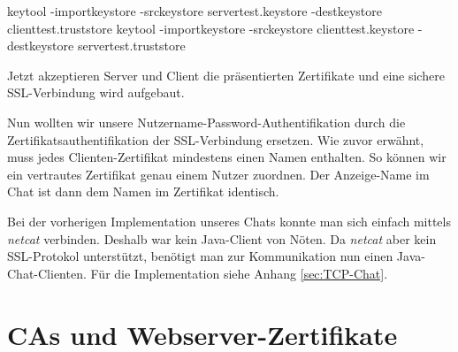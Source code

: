 \documentclass[a4paper,12bpt]{scrartcl}
\begin{document}
\begin{usercommands}
keytool -importkeystore -srckeystore servertest.keystore -destkeystore clienttest.truststore
keytool -importkeystore -srckeystore clienttest.keystore -destkeystore servertest.truststore
\end{usercommands}

Jetzt akzeptieren Server und Client die präsentierten Zertifikate und eine sichere
SSL-Verbindung wird aufgebaut.

\medskip

Nun wollten wir unsere Nutzername-Password-Authentifikation durch die Zertifikatsauthentifikation
der SSL-Verbindung ersetzen. Wie zuvor erwähnt, muss jedes Clienten-Zertifikat mindestens einen
Namen enthalten. So können wir ein vertrautes Zertifikat genau einem Nutzer zuordnen.
Der Anzeige-Name im Chat ist dann dem Namen im Zertifikat identisch.

\medskip

Bei der vorherigen Implementation unseres Chats konnte man sich einfach mittels \textit{netcat}
verbinden. Deshalb war kein Java-Client von Nöten. Da \textit{netcat} aber kein SSL-Protokol
unterstützt, benötigt man zur Kommunikation nun einen Java-Chat-Clienten. Für die Implementation
siehe Anhang \ref{sec:TCP-Chat}.

\section{CAs und Webserver-Zertifikate}
\label{sec:certs}
\end{document}
